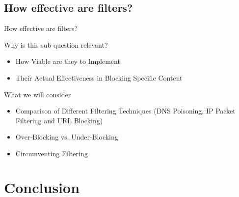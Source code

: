     \subsection{How effective are filters?}
    \begin{frame}{How effective are filters?}
    \begin{block}{Why is this sub-question relevant?}
        \begin{itemize}
                \item How Viable are they to Implement
                \item Their Actual Effectiveness in Blocking Specific Content %
            \end{itemize}
      \end{block}
      
      \begin{block}{What we will consider}
        \begin{itemize}
                \item Comparison of Different Filtering Techniques (DNS Poisoning, IP Packet Filtering and URL Blocking) 
                \item Over-Blocking vs. Under-Blocking
                \item Circumventing Filtering
            \end{itemize}
      \end{block}
    \end{frame}
    

 
    
    \section{Conclusion}
